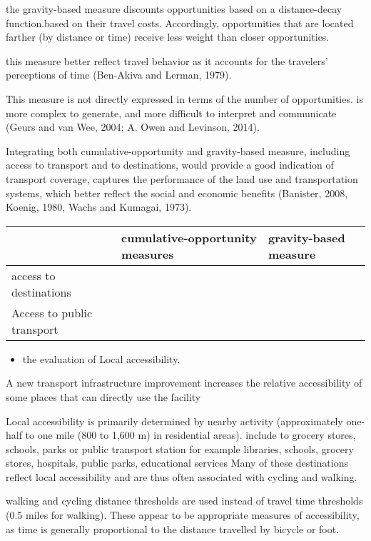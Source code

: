 \documentclass[12pt,]{article}
\providecommand{\tightlist}{%
  \setlength{\itemsep}{0pt}\setlength{\parskip}{0pt}}
\begin{document}
the gravity-based measure discounts opportunities based on a
distance-decay function.based on their travel costs. Accordingly,
opportunities that are located farther (by distance or time) receive
less weight than closer opportunities.

this measure better reflect travel behavior as it accounts for the
travelers' perceptions of time (Ben-Akiva and Lerman, 1979).

This measure is not directly expressed in terms of the number of
opportunities. is more complex to generate, and more difficult to
interpret and communicate (Geurs and van Wee, 2004; A. Owen and
Levinson, 2014).

Integrating both cumulative-opportunity and gravity-based measure,
including access to transport and to destinations, would provide a good
indication of transport coverage, captures the performance of the land
use and transportation systems, which better reflect the social and
economic benefits (Banister, 2008, Koenig, 1980, Wachs and Kumagai,
1973).

\begin{longtable}[]{@{}lll@{}}
\toprule
& cumulative-opportunity measures & gravity-based measure\tabularnewline
\midrule
\endhead
access to destinations & &\tabularnewline
Access to public transport & &\tabularnewline
\bottomrule
\end{longtable}

\begin{itemize}
\tightlist
\item
  the evaluation of Local accessibility.
\end{itemize}

A new transport infrastructure improvement increases the relative
accessibility of some places that can directly use the facility

Local accessibility is primarily determined by nearby activity
(approximately one-half to one mile (800 to 1,600 m) in residential
areas). include to grocery stores, schools, parks or public transport
station for example libraries, schools, grocery stores, hospitals,
public parks, educational services Many of these destinations reflect
local accessibility and are thus often associated with cycling and
walking.

walking and cycling distance thresholds are used instead of travel time
thresholds (0.5 miles for walking). These appear to be appropriate
measures of accessibility, as time is generally proportional to the
distance travelled by bicycle or foot.
\end{document}
